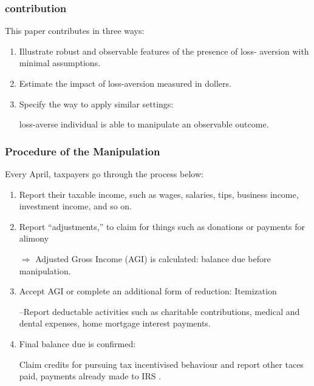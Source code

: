 \documentclass[dvipdfmx,12pt]{beamer}
\begin{document}
\begin{frame}\frametitle{contribution}
  This paper contributes in three ways:

  \begin{enumerate}
    \item Illustrate robust and observable features of the presence of loss-
    aversion with minimal assumptions.

    \item Estimate the impact of loss-aversion measured in dollers.

    \item Specify the way to apply similar settings:

    loss-averse individual is able to manipulate an observable outcome.
  \end{enumerate}
\end{frame}

\begin{frame}\frametitle{Procedure of the Manipulation}
  Every April, taxpayers go through the process below:
  \begin{enumerate}
    \item Report their taxable income, such as wages, salaries,
    tips, business income, investment income, and so on.

    \item Report ``adjustments,'' to claim for things such as donations or
    payments for alimony

    $\Rightarrow$ Adjusted Gross Income (AGI) is calculated: balance due
    before manipulation.

    \item Accept AGI or complete an additional form of reduction: Itemization

    --Report deductable activities such as charitable contributions, medical
    and dental expenses, home mortgage interest payments.

    \item Final balance due is confirmed:

    Claim credits for pursuing tax incentivised behaviour and report other
    taces paid, payments already made to IRS .
  \end{enumerate}
\end{frame}
\end{document}
